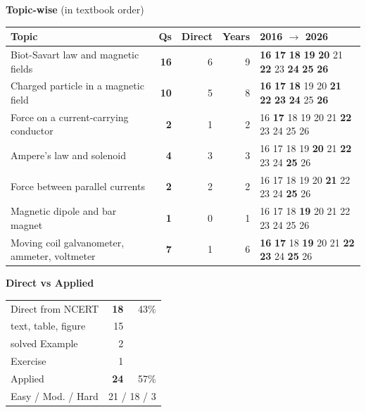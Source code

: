 {\small\textbf{\color{crimson}Topic-wise} (in textbook order)\par\smallskip
\begin{tabularx}{\linewidth}{@{}>{\raggedright\arraybackslash}Xrrrl@{}}\toprule
Topic & Qs & Direct & Years & 2016 $\rightarrow$ 2026\\\midrule
Biot-Savart law and magnetic fields & \textbf{16} & 6 & 9 & {\scriptsize \textbf{16} \textbf{17} \textbf{18} \textbf{19} \textbf{20} {\color{gray!45}21} \textbf{22} {\color{gray!45}23} \textbf{24} \textbf{25} \textbf{26}}\\
Charged particle in a magnetic field & \textbf{10} & 5 & 8 & {\scriptsize \textbf{16} \textbf{17} \textbf{18} {\color{gray!45}19} {\color{gray!45}20} \textbf{21} \textbf{22} \textbf{23} \textbf{24} {\color{gray!45}25} \textbf{26}}\\
Force on a current-carrying conductor & \textbf{2} & 1 & 2 & {\scriptsize {\color{gray!45}16} \textbf{17} {\color{gray!45}18} {\color{gray!45}19} {\color{gray!45}20} {\color{gray!45}21} \textbf{22} {\color{gray!45}23} {\color{gray!45}24} {\color{gray!45}25} {\color{gray!45}26}}\\
Ampere's law and solenoid & \textbf{4} & 3 & 3 & {\scriptsize {\color{gray!45}16} {\color{gray!45}17} {\color{gray!45}18} {\color{gray!45}19} \textbf{20} {\color{gray!45}21} \textbf{22} {\color{gray!45}23} {\color{gray!45}24} \textbf{25} {\color{gray!45}26}}\\
Force between parallel currents & \textbf{2} & 2 & 2 & {\scriptsize {\color{gray!45}16} {\color{gray!45}17} {\color{gray!45}18} {\color{gray!45}19} {\color{gray!45}20} \textbf{21} {\color{gray!45}22} {\color{gray!45}23} {\color{gray!45}24} \textbf{25} {\color{gray!45}26}}\\
Magnetic dipole and bar magnet & \textbf{1} & 0 & 1 & {\scriptsize {\color{gray!45}16} {\color{gray!45}17} {\color{gray!45}18} \textbf{19} {\color{gray!45}20} {\color{gray!45}21} {\color{gray!45}22} {\color{gray!45}23} {\color{gray!45}24} {\color{gray!45}25} {\color{gray!45}26}}\\
Moving coil galvanometer, ammeter, voltmeter & \textbf{7} & 1 & 6 & {\scriptsize \textbf{16} \textbf{17} {\color{gray!45}18} \textbf{19} {\color{gray!45}20} {\color{gray!45}21} \textbf{22} \textbf{23} {\color{gray!45}24} \textbf{25} {\color{gray!45}26}}\\
\bottomrule\end{tabularx}}\par\medskip
\begin{minipage}[t]{0.34\linewidth}{\small\textbf{\color{crimson}Direct vs Applied}\par\smallskip
\begin{tabular}{@{}lrr@{}}\toprule
Direct from NCERT & \textbf{18} & 43\%\\
\quad text, table, figure & 15 &\\
\quad solved Example & 2 &\\
\quad Exercise & 1 &\\
Applied & \textbf{24} & 57\%\\\midrule
Easy / Mod. / Hard & \multicolumn{2}{r}{21 / 18 / 3}\\\bottomrule
\end{tabular}}\end{minipage}\hfill
